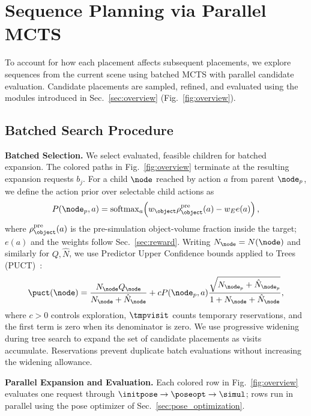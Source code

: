 \section{Sequence Planning via Parallel MCTS}\label{sec:sequence_planning}

To account for how each placement affects subsequent placements, we explore sequences from the current scene using batched MCTS with parallel candidate evaluation.
Candidate placements are sampled, refined, and evaluated using the modules introduced in Sec.~\ref{sec:overview} (Fig.~\ref{fig:overview}).

\subsection{Batched Search Procedure}\label{sec:mcts}

\noindent \textbf{Batched Selection.}
We select evaluated, feasible children for batched expansion.
The colored paths in Fig.~\ref{fig:overview} terminate at the resulting expansion requests $b_j$.
For a child $\node$ reached by action $a$ from parent $\node_p$, we define the action prior over selectable child actions as
\begin{equation*}
 P(\node_p,a)=\operatorname{softmax}_{a}\!\left(w_\object\rho_\object^{\mathrm{pre}}(a)-w_E e(a)\right),
\end{equation*}
where $\rho_\object^{\mathrm{pre}}(a)$ is the pre-simulation object-volume fraction inside the target; $e(a)$ and the weights follow Sec.~\ref{sec:reward}.
Writing $N_{\node}=N(\node)$ and similarly for $Q,\hat N$, we use Predictor Upper Confidence bounds applied to Trees (PUCT)~\cite{silver2017mastering}:
\begin{equation}
    \puct(\node)=\frac{N_{\node}Q_{\node}}{N_{\node}+\hat N_{\node}}
    +cP(\node_p,a)\frac{\sqrt{N_{\node_p}+\hat N_{\node_p}}}
         {1+N_{\node}+\hat N_{\node}},
    \label{eq:puct}
\end{equation}
where $c>0$ controls exploration, $\tmpvisit$ counts temporary reservations, and the first term is zero when its denominator is zero.
We use progressive widening~\cite{couetoux2011continuousuct} during tree search to expand the set of candidate placements as visits accumulate.
Reservations prevent duplicate batch evaluations without increasing the widening allowance.

\noindent \textbf{Parallel Expansion and Evaluation.}
Each colored row in Fig.~\ref{fig:overview} evaluates one request through $\initpose\to\poseopt\to\simul$; rows run in parallel using the pose optimizer of Sec.~\ref{sec:pose_optimization}.

